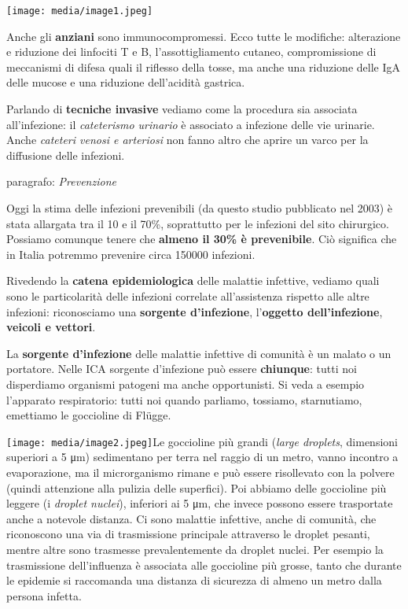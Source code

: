 \documentclass[]{article}
\begin{document}
\texttt{[image: media/image1.jpeg]}

Anche gli \textbf{anziani} sono immunocompromessi. Ecco tutte le
modifiche: alterazione e riduzione dei linfociti T e B,
l'assottigliamento cutaneo, compromissione di meccanismi di difesa quali
il riflesso della tosse, ma anche una riduzione delle IgA delle mucose e
una riduzione dell'acidità gastrica.

Parlando di \textbf{tecniche invasive} vediamo come la procedura sia
associata all'infezione: il \emph{cateterismo urinario} è associato a
infezione delle vie urinarie. Anche \emph{cateteri venosi e arteriosi}
non fanno altro che aprire un varco per la diffusione delle infezioni.

paragrafo: \emph{Prevenzione}

Oggi la stima delle infezioni prevenibili (da questo studio pubblicato
nel 2003) è stata allargata tra il 10 e il 70\%, soprattutto per le
infezioni del sito chirurgico. Possiamo comunque tenere che
\textbf{almeno il 30\% è prevenibile}. Ciò significa che in Italia
potremmo prevenire circa 150000 infezioni.

Rivedendo la \textbf{catena epidemiologica} delle malattie infettive,
vediamo quali sono le particolarità delle infezioni correlate
all'assistenza rispetto alle altre infezioni: riconosciamo una
\textbf{sorgente d'infezione}, l'\textbf{oggetto dell'infezione},
\textbf{veicoli e vettori}.

La \textbf{sorgente d'infezione} delle malattie infettive di comunità è
un malato o un portatore. Nelle ICA sorgente d'infezione può essere
\textbf{chiunque}: tutti noi disperdiamo organismi patogeni ma anche
opportunisti. Si veda a esempio l'apparato respiratorio: tutti noi
quando parliamo, tossiamo, starnutiamo, emettiamo le goccioline di
Flügge.

\texttt{[image: media/image2.jpeg]}Le
goccioline più grandi (\emph{large droplets}, dimensioni superiori a 5
μm) sedimentano per terra nel raggio di un metro, vanno incontro a
evaporazione, ma il microrganismo rimane e può essere risollevato con la
polvere (quindi attenzione alla pulizia delle superfici). Poi abbiamo
delle goccioline più leggere (i \emph{droplet nuclei}), inferiori ai 5
μm, che invece possono essere trasportate anche a notevole distanza. Ci
sono malattie infettive, anche di comunità, che riconoscono una via di
trasmissione principale attraverso le droplet pesanti, mentre altre sono
trasmesse prevalentemente da droplet nuclei. Per esempio la trasmissione
dell'influenza è associata alle goccioline più grosse, tanto che durante
le epidemie si raccomanda una distanza di sicurezza di almeno un metro
dalla persona infetta.
\end{document}
